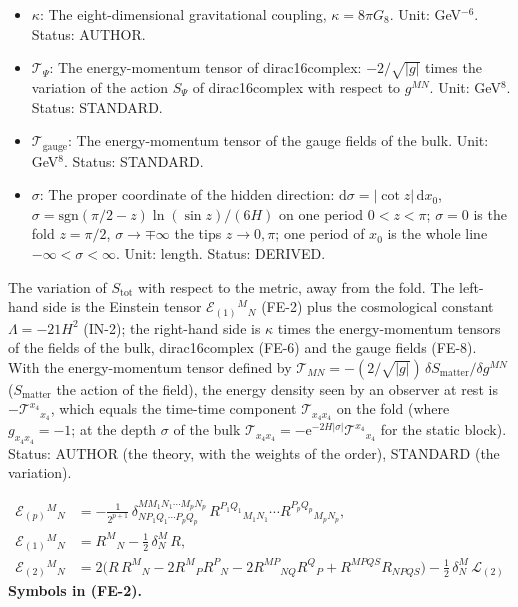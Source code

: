 \documentclass[
  10pt,
]{article}
\begin{document}
\begin{itemize}
  lower ones, 0 otherwise). Status: STANDARD.
\item
  \(\kappa\): The eight-dimensional gravitational coupling,
  \(\kappa = 8\pi G_8\). Unit: GeV\(^{-6}\). Status: AUTHOR.
\item
  \(\mathcal{T}_\Psi\): The energy-momentum tensor of dirac16complex:
  \(-2/\sqrt{\lvert g\rvert}\) times the variation of the action
  \(S_\Psi\) of dirac16complex with respect to \(g^{MN}\). Unit:
  GeV\(^8\). Status: STANDARD.
\item
  \(\mathcal{T}_{\mathrm{gauge}}\): The energy-momentum tensor of the
  gauge fields of the bulk. Unit: GeV\(^8\). Status: STANDARD.
\item
  \(\sigma\): The proper coordinate of the hidden direction:
  \(\mathrm{d}\sigma = \lvert\cot z\rvert\,\mathrm{d}x_0\),
  \(\sigma = \mathrm{sgn}(\pi/2 - z)\ln(\sin z)/(6H)\) on one period
  \(0 < z < \pi\); \(\sigma = 0\) is the fold \(z = \pi/2\),
  \(\sigma \to \mp\infty\) the tips \(z \to 0, \pi\); one period of
  \(x_0\) is the whole line \(-\infty < \sigma < \infty\). Unit: length.
  Status: DERIVED.
\end{itemize}

The variation of \(S_{\mathrm{tot}}\) with respect to the metric, away
from the fold. The left-hand side is the Einstein tensor
\(\mathcal{E}_{(1)}{}^M{}_N\) (FE-2) plus the cosmological constant
\(\Lambda = -21H^2\) (IN-2); the right-hand side is \(\kappa\) times the
energy-momentum tensors of the fields of the bulk, dirac16complex (FE-6)
and the gauge fields (FE-8). With the energy-momentum tensor defined by
\(\mathcal{T}_{MN} = -(2/\sqrt{\lvert g\rvert})\,\delta S_{\mathrm{matter}}/\delta g^{MN}\)
(\(S_{\mathrm{matter}}\) the action of the field), the energy density
seen by an observer at rest is \(-\mathcal{T}^{x_4}{}_{x_4}\), which
equals the time-time component \(\mathcal{T}_{x_4x_4}\) on the fold
(where \(g_{x_4x_4} = -1\); at the depth \(\sigma\) of the bulk
\(\mathcal{T}_{x_4x_4} = -\mathrm{e}^{-2H\lvert\sigma\rvert}\mathcal{T}^{x_4}{}_{x_4}\)
for the static block). Status: AUTHOR (the theory, with the weights of
the order), STANDARD (the variation).

\[
\begin{aligned}
\mathcal{E}_{(p)}{}^M{}_N &= -\frac{1}{2^{p+1}}\,\delta^{MM_1N_1\cdots M_pN_p}_{NP_1Q_1\cdots P_pQ_p}\,
 R^{P_1Q_1}{}_{M_1N_1}\cdots R^{P_pQ_p}{}_{M_pN_p},\\
\mathcal{E}_{(1)}{}^M{}_N &= R^M{}_N - \frac12\,\delta^M_N\,R,\\
\mathcal{E}_{(2)}{}^M{}_N &= 2\big(R\,R^M{}_N - 2R^M{}_PR^P{}_N - 2R^{MP}{}_{NQ}R^Q{}_P + R^{MPQS}R_{NPQS}\big)
 - \frac12\,\delta^M_N\,\mathcal{L}_{(2)}
\end{aligned} \tag{FE-2}
\] \textbf{Symbols in (FE-2).}
\end{document}
